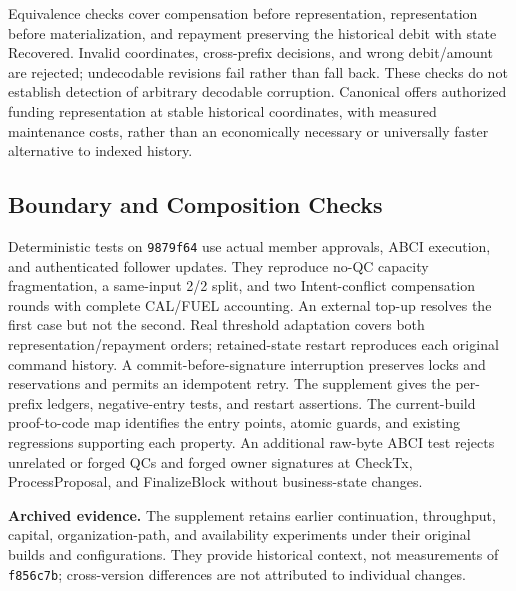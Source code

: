 Equivalence checks cover compensation before representation,
representation before materialization, and repayment preserving the
historical debit with state Recovered. Invalid coordinates,
cross-prefix decisions, and wrong debit/amount are rejected;
undecodable revisions fail rather than fall back. These checks do
not establish detection of arbitrary decodable corruption.
Canonical offers authorized funding representation at stable
historical coordinates, with measured maintenance costs, rather
than an economically necessary or universally faster alternative
to indexed history.



\subsection{Boundary and Composition Checks}
\label{sec:eval-boundaries}
Deterministic tests on \texttt{9879f64} use actual member approvals,
ABCI execution, and authenticated follower updates. They reproduce
no-QC capacity fragmentation, a same-input 2/2 split, and two
Intent-conflict compensation rounds with complete CAL/FUEL accounting.
An external top-up resolves the first case but not the second. Real
threshold adaptation covers both representation/repayment orders;
retained-state restart reproduces each original command history.
A commit-before-signature interruption preserves locks and reservations
and permits an idempotent retry. The supplement gives the per-prefix
ledgers, negative-entry tests, and restart assertions. The current-build
proof-to-code map identifies the entry points, atomic guards, and existing
regressions supporting each property. An additional raw-byte ABCI test
rejects unrelated or forged QCs and forged owner signatures at CheckTx,
ProcessProposal, and FinalizeBlock without business-state changes.

\noindent\textbf{Archived evidence.}
The supplement retains earlier continuation, throughput, capital,
organization-path, and availability experiments under their original
builds and configurations. They provide historical context, not
measurements of \texttt{f856c7b}; cross-version differences are not
attributed to individual changes.

